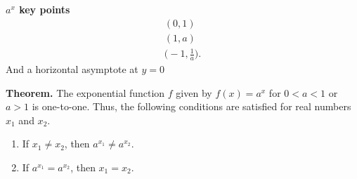 \documentclass{report}
\begin{document}
      \bigbreak \noindent 
      \begin{mdframed}
        \textbf{$a^{x}$ key points}
        \begin{align*}
          (0,1) \\
          (1,a) \\
          \bigg(-1, \frac{1}{a}\bigg)
        .\end{align*}
        \bigbreak \noindent 
        And a horizontal asymptote at $y=0$
      \end{mdframed}

      \bigbreak \noindent 
      \begin{mdframed}
        \textbf{Theorem.}
        \bigbreak \noindent 
        The exponential function $f$ given by $f(x) = a^x$ for $0 < a < 1$ or $a > 1$ is one-to-one. Thus, the following conditions are satisfied for real numbers $x_1$ and $x_2$.
        \begin{enumerate}
            \item If $x_1 \neq x_2$, then $a^{x_1} \neq a^{x_2}$.
            \item If $a^{x_{1}} = a^{x_{2}}$, then $x_1 = x_2$.
        \end{enumerate}
      \end{mdframed}
\end{document}

